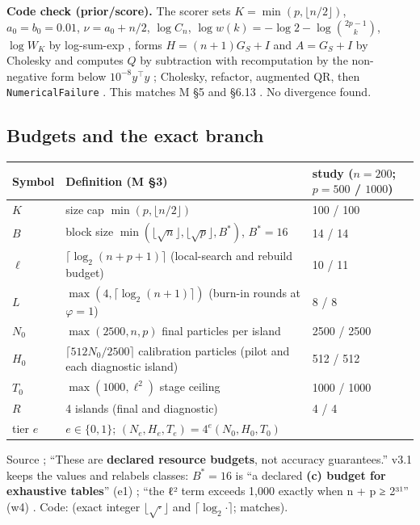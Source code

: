 \textbf{Code check (prior/score).} The scorer sets $K=\min(p,\lfloor n/2\rfloor)$, $a_0=b_0=0.01$, $\nu=a_0+n/2$,
$\log C_n$, $\log w(k)=-\log 2-\log\binom{2p-1}{k}$, $\log W_K$ by log-sum-exp
, forms $H=(n+1)G_S+I$ and
$A=G_S+I$ by Cholesky and computes $Q$ by subtraction with recomputation by the non-negative form below
$10^{-8}y^\top y$ ; Cholesky,
refactor, augmented QR, then \texttt{NumericalFailure}
. This matches M \S5 and \S6.13
. No divergence found.

\subsection{Budgets and the exact branch}\label{sec:method-budgets}

\begin{center}\small
\begin{tabular}{@{}lll@{}}
\toprule
Symbol & Definition (M \S3) & study ($n=200$; $p=500$ / $1000$)\\
\midrule
$K$ & size cap $\min(p,\lfloor n/2\rfloor)$ & 100 / 100\\
$B$ & block size $\min(\lfloor\sqrt n\rfloor,\lfloor\sqrt p\rfloor,B^*)$, $B^*=16$ & 14 / 14\\
$\ell$ & $\lceil\log_2(n+p+1)\rceil$ (local-search and rebuild budget) & 10 / 11\\
$L$ & $\max(4,\lceil\log_2(n+1)\rceil)$ (burn-in rounds at $\varphi=1$) & 8 / 8\\
$N_0$ & $\max(2500,n,p)$ final particles per island & 2500 / 2500\\
$H_0$ & $\lceil 512N_0/2500\rceil$ calibration particles (pilot and each diagnostic island) & 512 / 512\\
$T_0$ & $\max(1000,\ell^2)$ stage ceiling & 1000 / 1000\\
$R$ & 4 islands (final and diagnostic) & 4 / 4\\
tier $e$ & $e\in\{0,1\}$; $(N_e,H_e,T_e)=4^e(N_0,H_0,T_0)$ & \\
\bottomrule
\end{tabular}
\end{center}
Source ; ``These are \textbf{declared resource budgets}, not accuracy
guarantees.'' v3.1 keeps the values and relabels classes: $B^*=16$ is ``a declared \textbf{(c) budget for exhaustive
tables}'' (e1) ; ``the ℓ² term exceeds 1,000 exactly when
n + p ≥ 2³¹'' (w4) . Code:
 (exact integer
$\lfloor\sqrt{\cdot}\rfloor$ and $\lceil\log_2\cdot\rceil$; matches).

